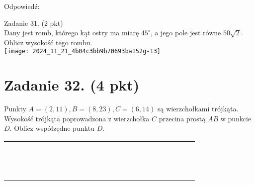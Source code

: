 \documentclass[10pt]{article}
\begin{document}
Odpowiedź:

Zadanie 31. (2 pkt)\\
Dany jest romb, którego kąt ostry ma miarę \(45^{\circ}\), a jego pole jest równe \(50 \sqrt{2}\). Oblicz wysokość tego rombu.\\
\texttt{[image: 2024\_11\_21\_4b04c3bb9b70693ba152g-13]}

\section*{Zadanie 32. (4 pkt)}
Punkty \(A=(2,11), B=(8,23), C=(6,14)\) są wierzchołkami trójkąta. Wysokość trójkąta poprowadzona z wierzchołka \(C\) przecina prostą \(A B\) w punkcie \(D\). Oblicz współzędne punktu \(D\).

\begin{center}
\begin{tabular}{|c|c|c|c|c|c|c|c|c|c|c|c|c|c|c|c|c|c|c|c|c|c|c|c|}
\hline
 &  &  &  &  &  &  &  &  &  &  &  &  &  &  &  &  &  &  &  &  &  &  &  \\
\hline
 &  &  &  &  &  &  &  &  &  &  &  &  &  &  &  &  &  &  &  &  &  &  &  \\
\hline
 &  &  &  &  &  &  &  &  &  &  &  &  &  &  &  &  &  &  &  &  &  &  &  \\
\hline
 &  &  &  &  &  &  &  &  &  &  &  &  &  &  &  &  &  &  &  &  &  &  &  \\
\hline
 &  &  &  &  &  &  &  &  &  &  &  &  &  &  &  &  &  &  &  &  &  &  &  \\
\hline
 &  &  &  &  &  &  &  &  &  &  &  &  &  &  &  &  &  &  &  &  &  &  &  \\
\hline
 &  &  &  &  &  &  &  &  &  &  &  &  &  &  &  &  &  &  &  &  &  &  &  \\
\hline
 &  &  &  &  &  &  &  &  &  &  &  &  &  &  &  &  &  &  &  &  &  &  &  \\
\hline
 &  &  &  &  &  &  &  &  &  &  &  &  &  &  &  &  &  &  &  &  &  &  &  \\
\hline
 &  &  &  &  &  &  &  &  &  &  &  &  &  &  &  &  &  &  &  &  &  &  &  \\
\hline
 &  &  &  &  &  &  &  &  &  &  &  &  &  &  &  &  &  &  &  &  &  &  &  \\
\hline
 &  &  &  &  &  &  &  &  &  &  &  &  &  &  &  &  &  &  &  &  &  &  &  \\
\hline
 &  &  &  &  &  &  &  &  &  &  &  &  &  &  &  &  &  &  &  &  &  &  &  \\
\hline
 &  &  &  &  &  &  &  &  &  &  &  &  &  &  &  &  &  &  &  &  &  &  &  \\

\end{tabular}
\end{center}
\end{document}
